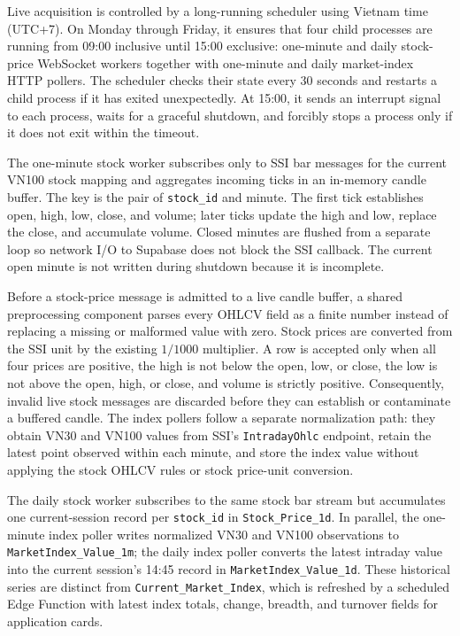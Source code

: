 Live acquisition is controlled by a long-running scheduler using Vietnam time (UTC+7). On Monday through Friday, it ensures that four child processes are running from 09:00 inclusive until 15:00 exclusive: one-minute and daily stock-price WebSocket workers together with one-minute and daily market-index HTTP pollers. The scheduler checks their state every 30 seconds and restarts a child process if it has exited unexpectedly. At 15:00, it sends an interrupt signal to each process, waits for a graceful shutdown, and forcibly stops a process only if it does not exit within the timeout.

The one-minute stock worker subscribes only to SSI bar messages for the current VN100 stock mapping and aggregates incoming ticks in an in-memory candle buffer. The key is the pair of \texttt{stock\_id} and minute. The first tick establishes open, high, low, close, and volume; later ticks update the high and low, replace the close, and accumulate volume. Closed minutes are flushed from a separate loop so network I/O to Supabase does not block the SSI callback. The current open minute is not written during shutdown because it is incomplete.

Before a stock-price message is admitted to a live candle buffer, a shared preprocessing component parses every OHLCV field as a finite number instead of replacing a missing or malformed value with zero. Stock prices are converted from the SSI unit by the existing \(1/1000\) multiplier. A row is accepted only when all four prices are positive, the high is not below the open, low, or close, the low is not above the open, high, or close, and volume is strictly positive. Consequently, invalid live stock messages are discarded before they can establish or contaminate a buffered candle. The index pollers follow a separate normalization path: they obtain VN30 and VN100 values from SSI's \texttt{IntradayOhlc} endpoint, retain the latest point observed within each minute, and store the index value without applying the stock OHLCV rules or stock price-unit conversion.

The daily stock worker subscribes to the same stock bar stream but accumulates one current-session record per \texttt{stock\_id} in \texttt{Stock\_Price\_1d}. In parallel, the one-minute index poller writes normalized VN30 and VN100 observations to \texttt{MarketIndex\_Value\_1m}; the daily index poller converts the latest intraday value into the current session's 14:45 record in \texttt{MarketIndex\_Value\_1d}. These historical series are distinct from \texttt{Current\_Market\_Index}, which is refreshed by a scheduled Edge Function with latest index totals, change, breadth, and turnover fields for application cards.

